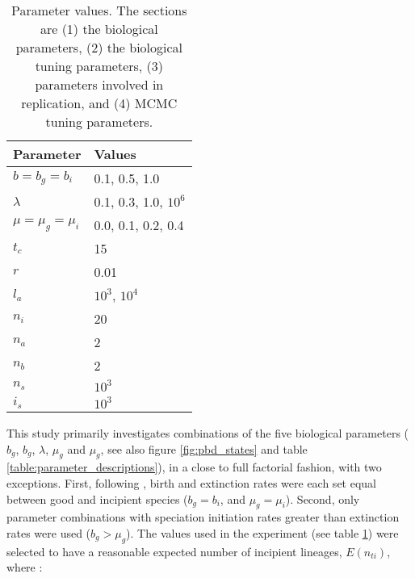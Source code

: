 
\begin{table}
  \centering 
  \begin{tabular}{l l}
    \hline
    Parameter             & Values \\
    \hline
    \hline
    $b = b_g = b_i$       & 0.1, 0.5, 1.0 \\
    $\lambda$             & 0.1, 0.3, 1.0, $10^6$ \\
    $\mu = \mu_g = \mu_i$ & 0.0, 0.1, 0.2, 0.4 \\
    \hline
    $t_c$                 & 15 \\
    $r$                   & 0.01 \\
    $l_a$                 & $10^3$, $10^4$ \\
    \hline
    $n_i$                 & 20 \\
    $n_a$                 & 2 \\
    $n_b$                 & 2 \\
    \hline
    $n_s$                 & $10^3$ \\
    $i_s$                 & $10^3$ \\
    \hline
  \end{tabular}
  \caption{
    Parameter values. The sections are (1) the biological parameters, (2) the
    biological tuning parameters, (3) parameters involved in replication, 
    and (4) MCMC tuning parameters.
  }
  \label{table:parameter_values}
\end{table}


This study primarily investigates combinations of the five biological 
parameters ($b_g$, $b_g$, $\lambda$, $\mu_g$ and $\mu_g$, 
see also figure \ref{fig:pbd_states} and table \ref{table:parameter_descriptions}), 
in a close to full factorial fashion, with two exceptions.
First, following \cite{etienne2014estimating}, birth and extinction rates were each 
set equal between good and incipient species ($b_g = b_i$, and $\mu_g = \mu_i$).
Second, only parameter combinations with speciation initiation rates greater
than extinction rates were used ($b_g > \mu_g$). The values 
used in the experiment (see table \ref{table:parameter_values}) 
were selected to have a reasonable expected number of incipient 
lineages, $E(n_{ti})$, where : 

